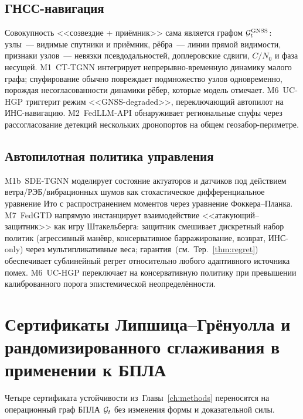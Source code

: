\subsection{ГНСС-навигация}
\label{sec:uav_gnss}

Совокупность <<созвездие + приёмник>> сама является графом
$\mathcal{G}_t^{\text{GNSS}}$: узлы~--- видимые спутники и приёмник, рёбра~---
линии прямой видимости, признаки узлов~--- невязки псевдодальностей,
доплеровские сдвиги, $C/N_0$ и фаза несущей. \textsf{M1~CT-TGNN}
интегрирует непрерывно-временную динамику малого графа; спуфирование
обычно повреждает подмножество узлов одновременно, порождая
несогласованности динамики рёбер, которые модель отмечает.
\textsf{M6~UC-HGP} триггерит режим <<GNSS-degraded>>, переключающий
автопилот на ИНС-навигацию. \textsf{M2~FedLLM-API} обнаруживает
региональные спуфы через рассогласование детекций нескольких
дронопортов на общем геозабор-периметре.

\subsection{Автопилотная политика управления}
\label{sec:uav_autopilot}

\textsf{M1b~SDE-TGNN} моделирует состояние актуаторов и датчиков под
действием ветра/РЭБ/вибрационных шумов как стохастическое
дифференциальное уравнение Ито с распространением моментов через
уравнение Фоккера--Планка. \textsf{M7~FedGTD} напрямую инстанцирует
взаимодействие <<атакующий--защитник>> как игру Штакельберга:
защитник смешивает дискретный набор политик (агрессивный манёвр,
консервативное барражирование, возврат, ИНС-only) через
мультипликативные веса; гарантия~(см.\ Тер.~\ref{thm:regret}) обеспечивает
сублинейный регрет относительно любого адаптивного источника помех.
\textsf{M6~UC-HGP} переключает на консервативную политику при
превышении калиброванного порога эпистемической неопределённости.


\section{Сертификаты Липшица--Грёнуолла и рандомизированного сглаживания
в применении к БПЛА}
\label{sec:uav_certs}

Четыре сертификата устойчивости из~Главы~\ref{ch:methods}
переносятся на операционный граф БПЛА $\mathcal{G}_t$ без изменения формы и
доказательной силы.

